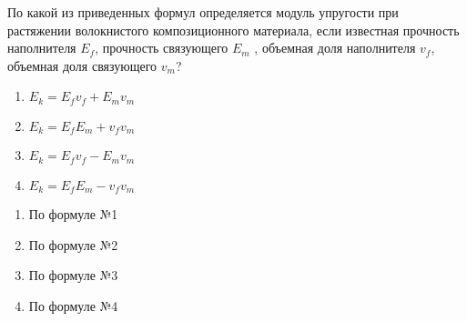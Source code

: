 
По какой из приведенных формул определяется модуль упругости
при растяжении волокнистого композиционного материала, если известная прочность
наполнителя $E_f$, прочность связующего $E_m$ , объемная доля наполнителя $v_f$, объемная доля 
связующего $v_m$?

\begin{enumerate}
    \item $ E_k=E_f v_f+E_m v_m $
    \item $ E_k=E_f E_m+v_f v_m $
    \item $ E_k=E_f v_f-E_m v_m $
    \item $ E_k=E_f E_m-v_f v_m $
\end{enumerate}

\begin{enumerate}
    \item По формуле №1
    \item По формуле №2
    \item По формуле №3
    \item По формуле №4
\end{enumerate}